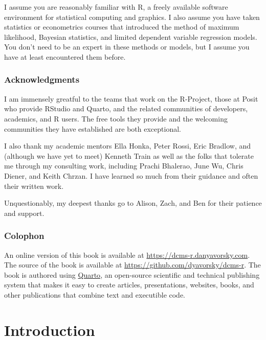 \documentclass[
  letterpaper,
  DIV=11,
  numbers=noendperiod]{scrreprt}
\begin{document}
I assume you are reasonably familiar with R, a freely available software
environment for statistical computing and graphics. I also assume you
have taken statistics or econometrics courses that introduced the method
of maximum likelihood, Bayesian statistics, and limited dependent
variable regression models. You don't need to be an expert in these
methods or models, but I assume you have at least encountered them
before.

\section*{Acknowledgments}\label{acknowledgments}


I am immensely greatful to the teams that work on the R-Project, those
at Posit who provide RStudio and Quarto, and the related communities of
developers, academics, and R users. The free tools they provide and the
welcoming communities they have established are both exceptional.

I also thank my academic mentors Ella Honka, Peter Rossi, Eric Bradlow,
and (although we have yet to meet) Kenneth Train as well as the folks
that tolerate me through my consulting work, including Prachi Bhalerao,
June Wu, Chris Diener, and Keith Chrzan. I have learned so much from
their guidance and often their written work.

Unquestionably, my deepest thanks go to Alison, Zach, and Ben for their
patience and support.

\section*{Colophon}\label{colophon}


An online version of this book is available at
\url{https://dcms-r.danyavorsky.com}. The source of the book is
available at \url{https://github.com/dyavorsky/dcms-r}. The book is
authored using \href{https://quarto.org}{Quarto}, an open-source
scientific and technical publishing system that makes it easy to create
articles, presentations, websites, books, and other publications that
combine text and executible code.

\part{Introduction}
\end{document}
